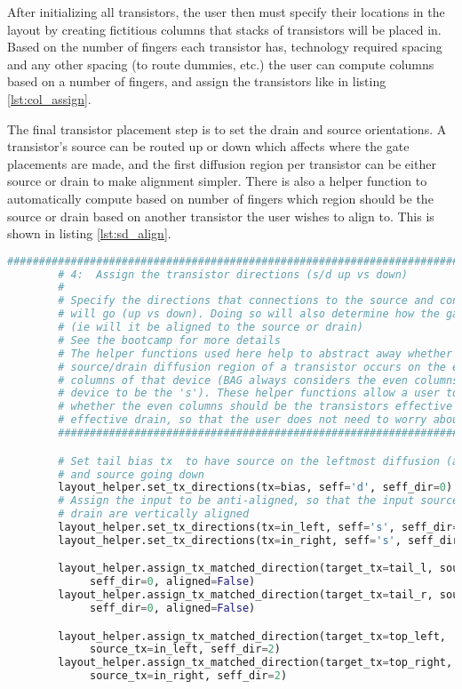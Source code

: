 After initializing all transistors, the user then must specify their locations in the layout by creating fictitious columns that stacks of transistors will be placed in. Based on the number of fingers each transistor has, technology required spacing and any other spacing (to route dummies, etc.) the user can compute columns based on a number of fingers, and assign the transistors like in listing \ref{lst:col_assign}.

The final transistor placement step is to set the drain and source orientations. A transistor's source can be routed up or down which affects where the gate placements are made, and the first diffusion region per transistor can be either source or drain to make alignment simpler. There is also a helper function to automatically compute based on number of fingers which region should be the source or drain based on another transistor the user wishes to align to. This is shown in listing \ref{lst:sd_align}.
\begin{lstlisting}[language=Python, caption=Determining transistor drain/source configurations, label={lst:sd_align}, float]
	      ################################################################################
        # 4:  Assign the transistor directions (s/d up vs down)
        #
        # Specify the directions that connections to the source and connections to the drain
        # will go (up vs down). Doing so will also determine how the gate is aligned
        # (ie will it be aligned to the source or drain)
        # See the bootcamp for more details
        # The helper functions used here help to abstract away whether the intended 
        # source/drain diffusion region of a transistor occurs on the even or odd
        # columns of that device (BAG always considers the even columns of a 
        # device to be the 's'). These helper functions allow a user to specify 
        # whether the even columns should be the transistors effective source or
        # effective drain, so that the user does not need to worry about BAG's notation.
        ################################################################################

        # Set tail bias tx  to have source on the leftmost diffusion (arbitrary)
        # and source going down
        layout_helper.set_tx_directions(tx=bias, seff='d', seff_dir=0)
        # Assign the input to be anti-aligned, so that the input source and tail
        # drain are vertically aligned
        layout_helper.set_tx_directions(tx=in_left, seff='s', seff_dir=0)
        layout_helper.set_tx_directions(tx=in_right, seff='s', seff_dir=0)

        layout_helper.assign_tx_matched_direction(target_tx=tail_l, source_tx=in_left,
             seff_dir=0, aligned=False)
        layout_helper.assign_tx_matched_direction(target_tx=tail_r, source_tx=in_right,
             seff_dir=0, aligned=False)

        layout_helper.assign_tx_matched_direction(target_tx=top_left, 
             source_tx=in_left, seff_dir=2)
        layout_helper.assign_tx_matched_direction(target_tx=top_right, 
             source_tx=in_right, seff_dir=2)
\end{lstlisting}
